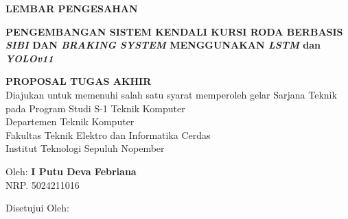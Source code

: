 \begin{center}
	\large
  \textbf{LEMBAR PENGESAHAN}
\end{center}
\thispagestyle{empty}

\begin{center}
  \textbf{PENGEMBANGAN SISTEM KENDALI KURSI RODA BERBASIS \emph{SIBI} DAN \emph{BRAKING SYSTEM} MENGGUNAKAN \emph{LSTM} dan \emph{YOLOv11}}
\end{center}

\begingroup
\small

\begin{center}
  \textbf{PROPOSAL TUGAS AKHIR} \\
  Diajukan untuk memenuhi salah satu syarat memperoleh gelar
  Sarjana Teknik pada
  Program Studi S-1 Teknik Komputer \\
  Departemen Teknik Komputer \\
  Fakultas Teknik Elektro dan Informatika Cerdas \\
  Institut Teknologi Sepuluh Nopember
\end{center}

\begin{center}
  Oleh: \textbf{I Putu Deva Febriana} \\
  NRP. 5024211016
\end{center}

\begin{center}
  Disetujui Oleh:
\end{center}

\begingroup
\setlength{\tabcolsep}{0pt}

